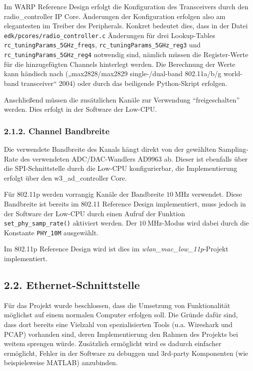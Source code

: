 \documentclass[ngerman,]{scrartcl}
\begin{document}
Im WARP Reference Design erfolgt die Konfiguration des Transceivers
durch den radio\_controller IP Core. Änderungen der Konfiguration
erfolgen also am elegantesten im Treiber des Peripherals. Konkret
bedeutet dies, dass in der Datei \texttt{edk/pcores/radio\_controller.c}
Änderungen für drei Lookup-Tables
\texttt{rc\_tuningParams\_5GHz\_freqs},
\texttt{rc\_tuningParams\_5GHz\_reg3} und
\texttt{rc\_tuningParams\_5GHz\_reg4} notwendig sind, nämlich müssen die
Register-Werte für die hinzugefügten Channels hinterlegt werden. Die
Berechnung der Werte kann händisch nach („max2828/max2829
single-/dual-band 802.11a/b/g world-band transceiver`` 2004) oder durch
das beiligende Python-Skript erfolgen.

Anschließend müssen die zusätzlichen Kanäle zur Verwendung
``freigeschalten'' werden. Dies erfolgt in der Software der Low-CPU.

\subsubsection{2.1.2. Channel Bandbreite}\label{channel-bandbreite}

Die verwendete Bandbreite des Kanals hängt direkt von der gewählten
Sampling-Rate des verwendeten ADC/DAC-Wandlers AD9963 ab. Dieser ist
ebenfalls über die SPI-Schnittstelle durch die Low-CPU konfigurierbar,
die Implementierung erfolgt über den w3\_ad\_controller Core.

Für 802.11p werden vorrangig Kanäle der Bandbreite
\(\SI{10}{\mega\hertz}\) verwendet. Diese Bandbreite ist bereits im
802.11 Reference Design implementiert, muss jedoch in der Software der
Low-CPU durch einen Aufruf der Funktion \texttt{set\_phy\_samp\_rate()}
aktiviert werden. Der \(\SI{10}{\mega\hertz}\)-Modus wird dabei durch
die Konstante \texttt{PHY\_10M} ausgewählt.

Im 802.11p Reference Design wird ist dies im
\emph{wlan\_mac\_low\_11p}-Projekt implementiert.

\subsection{2.2. Ethernet-Schnittstelle}\label{ethernet-schnittstelle}

Für das Projekt wurde beschlossen, dass die Umsetzung von Funktionalität
möglichst auf einem normalen Computer erfolgen soll. Die Gründe dafür
sind, dass dort bereits eine Vielzahl von spezialisierten Tools (u.a.
Wireshark und PCAP) vorhanden sind, deren Implementierung den Rahmen des
Projekts bei weitem sprengen würde. Zusätzlich ermöglicht wird es
dadurch einfacher ermöglicht, Fehler in der Software zu debuggen und
3rd-party Komponenten (wie beispielsweise MATLAB) anzubinden.
\end{document}
